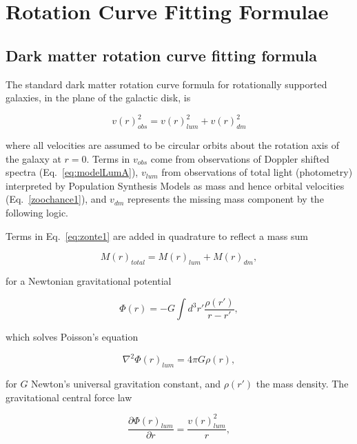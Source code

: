 \documentclass[reprint,%
 amsmath,amssymb,
 aps,
]{revtex4-1}
\begin{document}
\section{Rotation Curve Fitting Formulae  \label{sec:dos}}
 \subsection{Dark matter rotation curve fitting formula}
 
  

 The standard dark matter rotation curve formula for rotationally supported galaxies, in the plane of the galactic disk,  is 

 \begin{equation}
v(r)^2_{obs}  =  v(r)^2_{lum}  +  v(r)^2_{dm}   
\label{eq:zonte1}
\end{equation} 

  where all velocities are assumed to be circular orbits about the rotation axis of the galaxy at  $r=0$. Terms in  $v_{obs}$ come  from observations of Doppler shifted spectra (Eq.~\ref{eq:modelLumA}), $v_{lum}$ from observations of total light  (photometry) interpreted by Population Synthesis Models as mass and hence orbital velocities (Eq.~\ref{zoochance1}),  and $v_{dm}$ represents  the missing   mass component by the following logic.
  
  
 Terms in  Eq.~\ref{eq:zonte1} are added in quadrature to reflect a   mass sum
  
\begin{equation}
    M(r)_{total}   = M(r)_{lum}   + M(r)_{dm}  ,  
\end{equation}

for a  Newtonian gravitational potential 

\begin{equation}
      \Phi(r)  = -G \int d^3r'  \frac{ \rho(r') }{r-r'} ,
      \label{eq:Newt}
      \end{equation}

which solves Poisson's equation

\begin{equation}
\nabla^2 \Phi(r)_{lum}  = 4\pi G \rho(r),   
    \label{whatsgood}
\end{equation}

for $G$ Newton's universal gravitation constant, and 
$\rho(r')$  the mass density. 
The gravitational  central force law   

\begin{equation}
 \frac{\partial \Phi(r)_{lum}}{\partial r}    =\frac{v(r)_{lum}^2}{r},   
    \label{zoochance1}
\end{equation}
\end{document}
